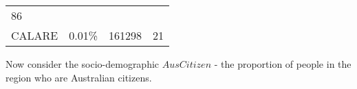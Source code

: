 \documentclass[openany]{book}
\begin{document}
\begin{longtable}[]{@{}llll@{}}
\begin{minipage}[t]{0.40\columnwidth}
86\strut
\end{minipage}\tabularnewline
\begin{minipage}[t]{0.17\columnwidth}\raggedright
CALARE\strut
\end{minipage} & \begin{minipage}[t]{0.10\columnwidth}\raggedright
0.01\%\strut
\end{minipage} & \begin{minipage}[t]{0.22\columnwidth}\raggedright
161298\strut
\end{minipage} & \begin{minipage}[t]{0.40\columnwidth}\raggedright
21\strut
\end{minipage}\tabularnewline
\bottomrule
\end{longtable}

Now consider the socio-demographic \(AusCitizen\) - the proportion of people in the region who are Australian citizens.
\end{document}

